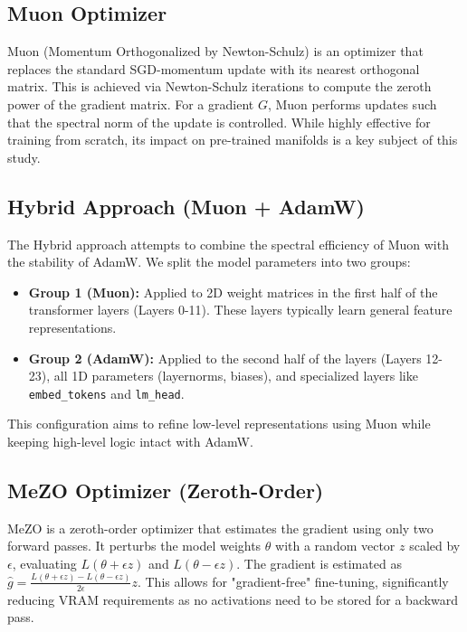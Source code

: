 \documentclass{article}
\begin{document}
\subsection{Muon Optimizer}
Muon (Momentum Orthogonalized by Newton-Schulz) is an optimizer that replaces the standard SGD-momentum update with its nearest orthogonal matrix. This is achieved via Newton-Schulz iterations to compute the zeroth power of the gradient matrix. 
For a gradient $G$, Muon performs updates such that the spectral norm of the update is controlled. While highly effective for training from scratch, its impact on pre-trained manifolds is a key subject of this study.

\subsection{Hybrid Approach (Muon + AdamW)}
The Hybrid approach attempts to combine the spectral efficiency of Muon with the stability of AdamW. We split the model parameters into two groups:
\begin{itemize}
    \item \textbf{Group 1 (Muon):} Applied to 2D weight matrices in the first half of the transformer layers (Layers 0-11). These layers typically learn general feature representations.
    \item \textbf{Group 2 (AdamW):} Applied to the second half of the layers (Layers 12-23), all 1D parameters (layernorms, biases), and specialized layers like \texttt{embed_tokens} and \texttt{lm_head}.
\end{itemize}
This configuration aims to refine low-level representations using Muon while keeping high-level logic intact with AdamW.

\subsection{MeZO Optimizer (Zeroth-Order)}
MeZO is a zeroth-order optimizer that estimates the gradient using only two forward passes. It perturbs the model weights $\theta$ with a random vector $z$ scaled by $\epsilon$, evaluating $L(\theta + \epsilon z)$ and $L(\theta - \epsilon z)$. The gradient is estimated as $\hat{g} = \frac{L(\theta + \epsilon z) - L(\theta - \epsilon z)}{2\epsilon} z$. This allows for "gradient-free" fine-tuning, significantly reducing VRAM requirements as no activations need to be stored for a backward pass.
\end{document}
